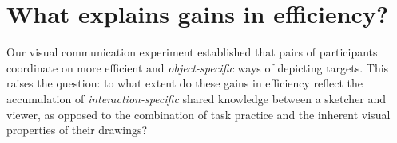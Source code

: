 






\section{What explains gains in efficiency?}

Our visual communication experiment established that pairs of participants coordinate on more efficient and \emph{object-specific} ways of depicting targets. %
This raises the question: to what extent do these gains in efficiency reflect the accumulation of \emph{interaction-specific} shared knowledge between a sketcher and viewer, as opposed to the combination of task practice and the inherent visual properties of their drawings?

